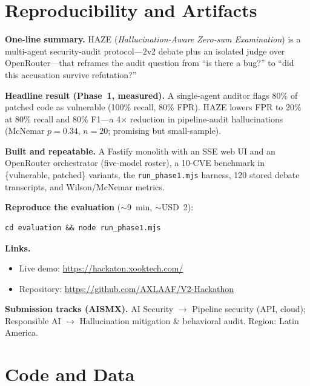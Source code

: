 \documentclass[10pt]{article}
\begin{document}
\section*{Reproducibility and Artifacts}

\textbf{One-line summary.} HAZE (\textit{Hallucination-Aware Zero-sum Examination})
is a multi-agent security-audit protocol---2v2 debate plus an isolated judge over
OpenRouter---that reframes the audit question from ``is there a bug?'' to ``did this
accusation survive refutation?''

\textbf{Headline result (Phase~1, measured).} A single-agent auditor flags 80\% of
patched code as vulnerable (100\% recall, 80\% FPR). HAZE lowers FPR to 20\% at
80\% recall and 80\% F1---a 4$\times$ reduction in pipeline-audit hallucinations
(McNemar $p{=}0.34$, $n{=}20$; promising but small-sample).

\textbf{Built and repeatable.} A Fastify monolith with an SSE web UI and an
OpenRouter orchestrator (five-model roster), a 10-CVE benchmark in
\{vulnerable, patched\} variants, the \texttt{run\_phase1.mjs} harness, 120 stored
debate transcripts, and Wilson/McNemar metrics.

\textbf{Reproduce the evaluation} (${\sim}$9~min, ${\sim}$USD~2):
\begin{verbatim}
cd evaluation && node run_phase1.mjs
\end{verbatim}

\textbf{Links.}
\begin{itemize}[leftmargin=*,nosep]
  \item Live demo: \url{https://hackaton.xooktech.com/}
  \item Repository: \url{https://github.com/AXLAAF/V2-Hackathon}
\end{itemize}

\textbf{Submission tracks (AISMX).} AI Security $\rightarrow$ Pipeline security
(API, cloud); Responsible AI $\rightarrow$ Hallucination mitigation \& behavioral
audit. Region: Latin America.

\section*{Code and Data}
\end{document}
